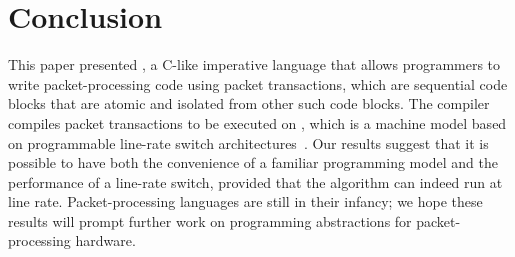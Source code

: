 \section{Conclusion}
\label{s:conclusion}
This paper presented \pktlanguage, a C-like imperative language that allows
programmers to write packet-processing code using packet transactions, which
are sequential code blocks that are atomic and isolated from other such code
blocks. The \pktlanguage compiler compiles packet transactions to be executed
on \absmachine, which is a machine model based on programmable line-rate switch
architectures~\cite{flexpipe, xpliant, tofino}. Our results suggest that it is
possible to have both the convenience of a familiar programming model and the
performance of a line-rate switch, provided that the algorithm can indeed run
at line rate.  Packet-processing languages are still in their infancy; we hope
these results will prompt further work on programming abstractions for
packet-processing hardware.
